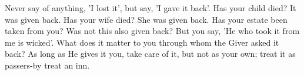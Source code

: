 Never say of anything,  'I lost it', but say, 'I gave it  back'. Has your child
died? It  was given  back. Has  your wife died?  She was  given back.  Has your
estate been taken from you? Was not this  also given back? But you say, 'He who
took it from me  is wicked'. What does it matter to you  through whom the Giver
asked it back?  As long as He  gives it you, take  care of it, but  not as your
own; treat it as passers-by treat an inn.
